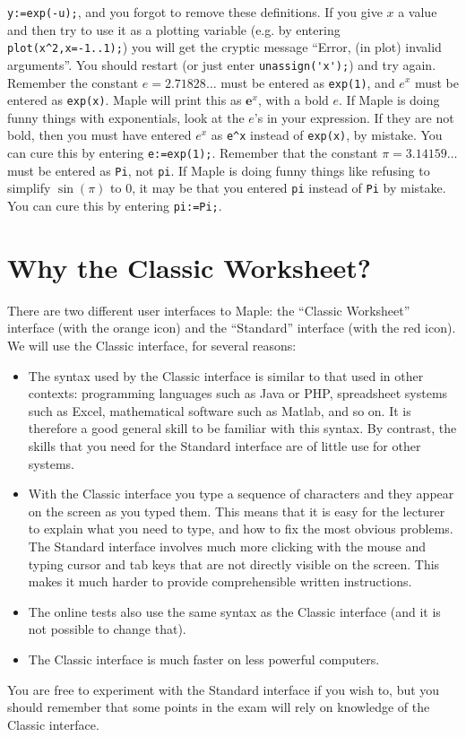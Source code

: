 \documentclass{amsart}
\begin{document}
\begin{itemize}
  \verb~y:=exp(-u);~, and you forgot to remove these
  definitions.  
%
  If you give $x$ a value and then try to use it as a
  plotting variable (e.g. by entering
  \verb~plot(x^2,x=-1..1);~) you will get the cryptic message
  ``Error, (in plot) invalid arguments''.  You should
  restart (or just enter \verb~unassign('x');~) and try again. 
%
  Remember the constant $e=2.71828\dots$ must be
  entered as \verb~exp(1)~, and $e^x$ must be entered as
  \verb~exp(x)~.  Maple will print this as $\textbf{e}^x$,
  with a bold $e$.  If Maple is doing funny things with
  exponentials, look at the $e$'s in your expression.  If
  they are not bold, then you must have entered $e^x$ as
  \verb~e^x~ instead of \verb~exp(x)~, by mistake.  You can
  cure this by entering \verb~e:=exp(1);~. 
%
  Remember that the constant
  $\pi=3.14159\dots$ must be 
  entered as \verb~Pi~, not \verb~pi~.  If Maple is doing
  funny things like refusing to simplify $\sin(\pi)$ to $0$,
  it may be that you entered \verb~pi~ instead of \verb~Pi~
  by mistake.  You can cure this by entering \verb~pi:=Pi;~. 
\end{itemize}

\section{Why the Classic Worksheet?}\label{sec-classic}

There are two different user interfaces to Maple: the ``Classic
Worksheet'' interface (with the orange icon) and the ``Standard''
interface (with the red icon).  We will use the Classic
interface, for several reasons:

\begin{itemize}
 \item The syntax used by the Classic interface is similar to that used
  in other contexts: programming languages such as Java or PHP,
  spreadsheet systems such as Excel, mathematical software such as
  Matlab, and so on.  It is therefore a good general skill to be
  familiar with this syntax.  By contrast, the skills that you need for
  the Standard interface are of little use for other systems.
 \item With the Classic interface you type a sequence of characters
  and they appear on the screen as you typed them.  This means that it
  is easy for the lecturer to explain what you need to type, and how
  to fix the most obvious problems.  The Standard interface involves
  much more clicking with the mouse and typing cursor and tab keys
  that are not directly visible on the screen.  This makes it much
  harder to provide comprehensible written instructions.
 \item The online tests also use the same syntax as the Classic
  interface (and it is not possible to change that).
 \item The Classic interface is much faster on less powerful computers.
\end{itemize}

You are free to experiment with the Standard interface if you wish to,
but you should remember that some points in the exam will rely on
knowledge of the Classic interface.
\end{document}
